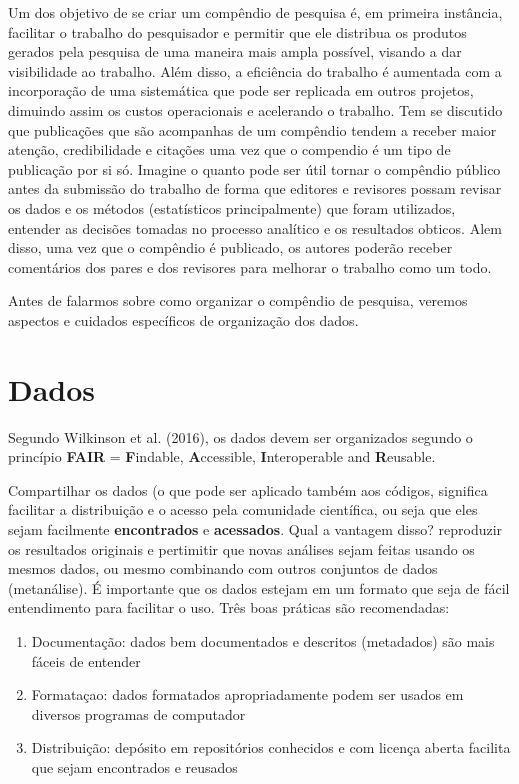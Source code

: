 \documentclass[]{book}
\providecommand{\tightlist}{%
  \setlength{\itemsep}{0pt}\setlength{\parskip}{0pt}}
\begin{document}
Um dos objetivo de se criar um compêndio de pesquisa é, em primeira
instância, facilitar o trabalho do pesquisador e permitir que ele
distribua os produtos gerados pela pesquisa de uma maneira mais ampla
possível, visando a dar visibilidade ao trabalho. Além disso, a
eficiência do trabalho é aumentada com a incorporação de uma sistemática
que pode ser replicada em outros projetos, dimuindo assim os custos
operacionais e acelerando o trabalho. Tem se discutido que publicações
que são acompanhas de um compêndio tendem a receber maior atenção,
credibilidade e citações uma vez que o compendio é um tipo de publicação
por si só. Imagine o quanto pode ser útil tornar o compêndio público
antes da submissão do trabalho de forma que editores e revisores possam
revisar os dados e os métodos (estatísticos principalmente) que foram
utilizados, entender as decisões tomadas no processo analítico e os
resultados obticos. Alem disso, uma vez que o compêndio é publicado, os
autores poderão receber comentários dos pares e dos revisores para
melhorar o trabalho como um todo.

Antes de falarmos sobre como organizar o compêndio de pesquisa, veremos
aspectos e cuidados específicos de organização dos dados.

\hypertarget{dados}{%
\section{Dados}\label{dados}}

Segundo Wilkinson et al. (2016), os dados devem ser organizados segundo
o princípio \textbf{FAIR} = \textbf{F}indable, \textbf{A}ccessible,
\textbf{I}nteroperable and \textbf{R}eusable.

Compartilhar os dados (o que pode ser aplicado também aos códigos,
significa facilitar a distribuição e o acesso pela comunidade
científica, ou seja que eles sejam facilmente \textbf{encontrados} e
\textbf{acessados}. Qual a vantagem disso? reproduzir os resultados
originais e pertimitir que novas análises sejam feitas usando os mesmos
dados, ou mesmo combinando com outros conjuntos de dados (metanálise). É
importante que os dados estejam em um formato que seja de fácil
entendimento para facilitar o uso. Três boas práticas são recomendadas:

\begin{enumerate}
\def\labelenumi{\arabic{enumi}.}
\tightlist
\item
  Documentação: dados bem documentados e descritos (metadados) são mais
  fáceis de entender
\item
  Formataçao: dados formatados apropriadamente podem ser usados em
  diversos programas de computador
\item
  Distribuição: depósito em repositórios conhecidos e com licença aberta
  facilita que sejam encontrados e reusados
\end{enumerate}
\end{document}
